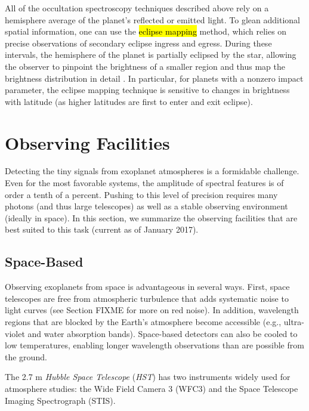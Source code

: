 \documentclass[graybox,natbib,nosecnum]{svmult}
\newcommand{\hbindex}[1]{\hl{#1}\index{#1}}  %
\newcommand{\project}[1]{\textsl{#1}}
\newcommand{\HST}{\project{HST}}
\begin{document}
All of the occultation spectroscopy techniques described above rely on a hemisphere average of the planet's reflected or emitted light. To glean additional spatial information, one can use the \hbindex{eclipse mapping} method, which relies on precise observations of secondary eclipse ingress and egress.  During these intervals, the hemisphere of the planet is partially eclipsed by the star, allowing the observer to pinpoint the brightness of a smaller region and thus map the brightness distribution in detail \citep{rauscher07}. In particular, for planets with a nonzero impact parameter, the eclipse mapping technique is sensitive to changes in brightness with latitude (as higher latitudes are first to enter and exit eclipse). 

\section{Observing Facilities}
Detecting the tiny signals from exoplanet atmospheres is a formidable challenge. Even for the most favorable systems, the amplitude of spectral features is of order a tenth of a percent. Pushing to this level of precision requires many photons (and thus large telescopes) as well as a stable observing environment (ideally in space).  In this section, we summarize the observing facilities that are best suited to this task (current as of January 2017).

\subsection{Space-Based}
Observing exoplanets from space is advantageous in several ways. First, space telescopes are free from atmospheric turbulence that adds systematic noise to light curves (see Section FIXME for more on red noise). In addition, wavelength regions that are blocked by the Earth's atmosphere become accessible (e.g., ultra-violet and water absorption bands).  Space-based detectors can also be cooled to low temperatures, enabling longer wavelength observations than are possible from the ground.

The 2.7 m \emph{Hubble Space Telescope} (\HST) has two instruments widely used for atmosphere studies: the Wide Field Camera 3 (WFC3) and the Space Telescope Imaging Spectrograph (STIS). 
\end{document}
